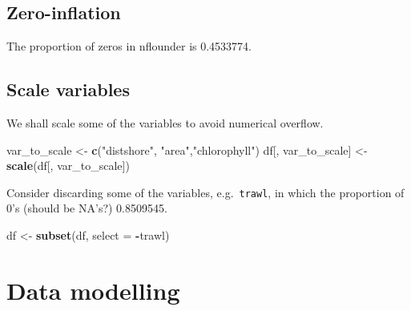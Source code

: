 \documentclass[
]{article}
\newenvironment{Shaded}{\begin{snugshade}}{\end{snugshade}}
\newcommand{\AttributeTok}[1]{\textcolor[rgb]{0.13,0.29,0.53}{#1}}
\newcommand{\CommentTok}[1]{\textcolor[rgb]{0.56,0.35,0.01}{\textit{#1}}}
\newcommand{\DecValTok}[1]{\textcolor[rgb]{0.00,0.00,0.81}{#1}}
\newcommand{\FunctionTok}[1]{\textcolor[rgb]{0.13,0.29,0.53}{\textbf{#1}}}
\newcommand{\NormalTok}[1]{#1}
\newcommand{\OtherTok}[1]{\textcolor[rgb]{0.56,0.35,0.01}{#1}}
\newcommand{\SpecialCharTok}[1]{\textcolor[rgb]{0.81,0.36,0.00}{\textbf{#1}}}
\newcommand{\StringTok}[1]{\textcolor[rgb]{0.31,0.60,0.02}{#1}}
\begin{document}
\subsection{Zero-inflation}\label{zero-inflation}

\begin{Shaded}
\end{Shaded}

The proportion of zeros in nflounder is 0.4533774.

\subsection{Scale variables}\label{scale-variables}

We shall scale some of the variables to avoid numerical overflow.

\begin{Shaded}
\begin{Highlighting}[]
\NormalTok{var\_to\_scale }\OtherTok{\textless{}{-}} \FunctionTok{c}\NormalTok{(}\StringTok{"distshore"}\NormalTok{, }\StringTok{"area"}\NormalTok{,}\StringTok{"chlorophyll"}\NormalTok{)}
\NormalTok{df[, var\_to\_scale] }\OtherTok{\textless{}{-}} \FunctionTok{scale}\NormalTok{(df[, var\_to\_scale])}
\end{Highlighting}
\end{Shaded}

Consider discarding some of the variables, e.g.~\texttt{trawl}, in which
the proportion of 0's (should be NA's?) 0.8509545.

\begin{Shaded}
\begin{Highlighting}[]
\NormalTok{df }\OtherTok{\textless{}{-}} \FunctionTok{subset}\NormalTok{(df, }\AttributeTok{select =} \SpecialCharTok{{-}}\NormalTok{trawl)}
\end{Highlighting}
\end{Shaded}

\section{Data modelling}\label{data-modelling}
\end{document}

